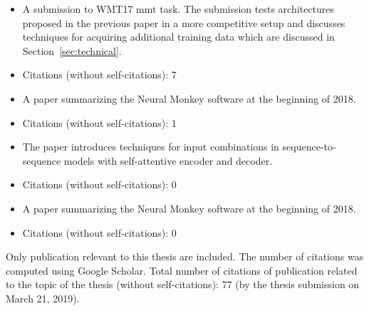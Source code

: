 
\newpage
\noindent{}
\begin{itemize}[noitemsep,topsep=0pt]

  \item A submission to WMT17 \gls{mmt} task. The submission tests
      architectures proposed in the previous paper in a more competitive setup
        and discusses techniques for acquiring additional training data which
        are discussed in Section~\ref{sec:technical}.

  \item Citations (without self-citations): 7

\end{itemize}\vspace{3mm}


\noindent{}
\begin{itemize}[noitemsep,topsep=0pt]

  \item A paper summarizing the Neural Monkey software at the beginning of
      2018.

  \item Citations (without self-citations): 1

\end{itemize}\vspace{3mm}


\noindent{}
\begin{itemize}[noitemsep,topsep=0pt]

  \item The paper introduces techniques for input combinations in
      sequence-to-sequence models with self-attentive encoder and decoder.

  \item Citations (without self-citations): 0

\end{itemize}\vspace{3mm}


\noindent{}
\begin{itemize}[noitemsep,topsep=0pt]

  \item A paper summarizing the Neural Monkey software at the beginning of
      2018.

  \item Citations (without self-citations): 0

\end{itemize}\vspace{3mm}

\vspace{1cm}

\noindent Only publication relevant to this thesis are included. The number of
citations was computed using Google Scholar. Total number of citations of
publication related to the topic of the thesis (without self-citations):
{\large 77} (by the thesis submission on March 21, 2019).
